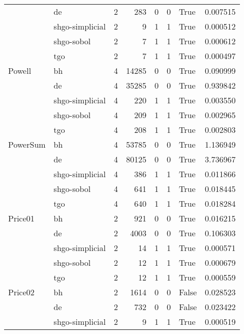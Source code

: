 \begin{longtable}{llrrrrlr}
         & de &     2 &      283 &      0 &       0 &    True &    0.007515 \\
         & shgo-simplicial &     2 &        9 &      1 &       1 &    True &    0.000512 \\
         & shgo-sobol &     2 &        7 &      1 &       1 &    True &    0.000612 \\
         & tgo &     2 &        7 &      1 &       1 &    True &    0.000497 \\
Powell & bh &     4 &    14285 &      0 &       0 &    True &    0.090999 \\
         & de &     4 &    35285 &      0 &       0 &    True &    0.939842 \\
         & shgo-simplicial &     4 &      220 &      1 &       1 &    True &    0.003550 \\
         & shgo-sobol &     4 &      209 &      1 &       1 &    True &    0.002965 \\
         & tgo &     4 &      208 &      1 &       1 &    True &    0.002803 \\
PowerSum & bh &     4 &    53785 &      0 &       0 &    True &    1.136949 \\
         & de &     4 &    80125 &      0 &       0 &    True &    3.736967 \\
         & shgo-simplicial &     4 &      386 &      1 &       1 &    True &    0.011866 \\
         & shgo-sobol &     4 &      641 &      1 &       1 &    True &    0.018445 \\
         & tgo &     4 &      640 &      1 &       1 &    True &    0.018284 \\
Price01 & bh &     2 &      921 &      0 &       0 &    True &    0.016215 \\
         & de &     2 &     4003 &      0 &       0 &    True &    0.106303 \\
         & shgo-simplicial &     2 &       14 &      1 &       1 &    True &    0.000571 \\
         & shgo-sobol &     2 &       12 &      1 &       1 &    True &    0.000679 \\
         & tgo &     2 &       12 &      1 &       1 &    True &    0.000559 \\
Price02 & bh &     2 &     1614 &      0 &       0 &   False &    0.028523 \\
         & de &     2 &      732 &      0 &       0 &   False &    0.023422 \\
         & shgo-simplicial &     2 &        9 &      1 &       1 &    True &    0.000519 \\

\end{longtable}

